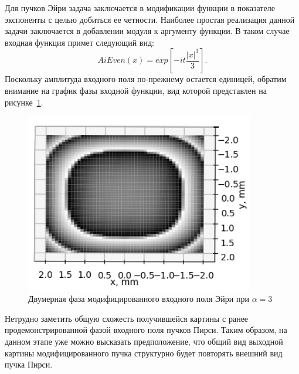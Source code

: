 {{    Для пучков Эйри задача заключается в модификации функции в показателе экспоненты с целью добиться ее четности.
    Наиболее простая реализация данной задачи заключается в добавлении модуля к аргументу функции.
    В таком случае входная функция примет следующий вид:
    \begin{equation*}
        AiEven(x) = exp[-it \frac{|x|^3}{3}].
    \end{equation*}
    Поскольку амплитуда входного поля по-прежнему остается единицей, обратим внимание на график фазы входной функции,
    вид которой представлен на рисунке~\ref{aieven_phase_2d}.
    \begin{figure}[H]
        \begin{center}
            \includegraphics[width=10cm]{plots/aievenphase_new}
            \caption{Двумерная фаза модифицированного входного поля Эйри при $\alpha  = 3$}
            \label{aieven_phase_2d}
        \end{center}
    \end{figure}

    Нетрудно заметить общую схожесть получившейся картины с ранее продемонстрированной фазой входного поля пучков Пирси.
    Таким образом, на данном этапе уже можно высказать предположение,
    что общий вид выходной картины модифицированного пучка структурно будет повторять внешний вид пучка Пирси.

}}
